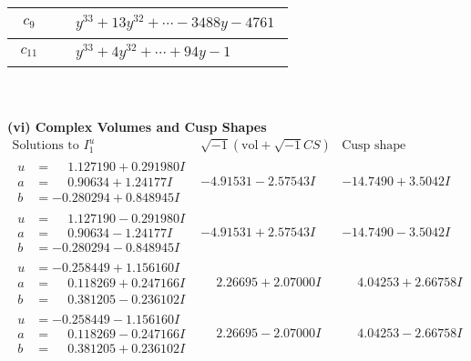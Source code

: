 \documentclass[1p]{elsarticle_modified}
\theoremstyle{definition}
\newcommand{\I}{\sqrt{-1}}
\begin{document}
\begin{tabular}{m{50pt}|m{274pt}}
\hline $$\begin{aligned}c_{9}\end{aligned}$$&$\begin{aligned}
&y^{33}+13 y^{32}+\cdots-3488 y-4761
\end{aligned}$\\
\hline $$\begin{aligned}c_{11}\end{aligned}$$&$\begin{aligned}
&y^{33}+4 y^{32}+\cdots+94 y-1
\end{aligned}$\\
\hline
\end{tabular}\\~\\
\newpage\flushleft \textbf{(vi) Complex Volumes and Cusp Shapes}
$$\begin{array}{c|c|c}  
\text{Solutions to }I^u_{1}& \I (\text{vol} + \sqrt{-1}CS) & \text{Cusp shape}\\
 \hline 
\begin{aligned}
u &= \phantom{-}1.127190 + 0.291980 I \\
a &= \phantom{-}0.90634 + 1.24177 I \\
b &= -0.280294 + 0.848945 I\end{aligned}
 & -4.91531 - 2.57543 I & -14.7490 + 3.5042 I \\ \hline\begin{aligned}
u &= \phantom{-}1.127190 - 0.291980 I \\
a &= \phantom{-}0.90634 - 1.24177 I \\
b &= -0.280294 - 0.848945 I\end{aligned}
 & -4.91531 + 2.57543 I & -14.7490 - 3.5042 I \\ \hline\begin{aligned}
u &= -0.258449 + 1.156160 I \\
a &= \phantom{-}0.118269 + 0.247166 I \\
b &= \phantom{-}0.381205 - 0.236102 I\end{aligned}
 & \phantom{-}2.26695 + 2.07000 I & \phantom{-}4.04253 + 2.66758 I \\ \hline\begin{aligned}
u &= -0.258449 - 1.156160 I \\
a &= \phantom{-}0.118269 - 0.247166 I \\
b &= \phantom{-}0.381205 + 0.236102 I\end{aligned}
 & \phantom{-}2.26695 - 2.07000 I & \phantom{-}4.04253 - 2.66758 I \\ \hline\begin{aligned}

\end{aligned}
\end{array}$$
\end{document}
